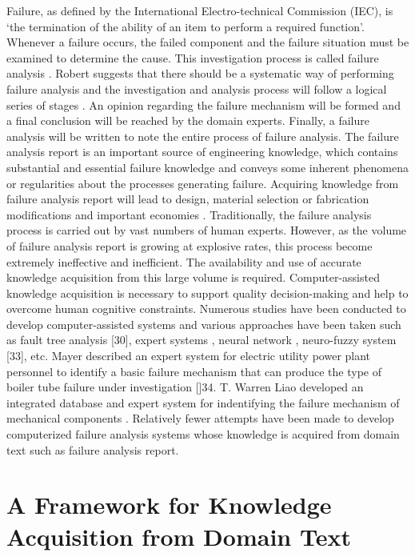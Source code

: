 \documentclass{elsarticle}
\begin{document}
Failure, as defined by the International Electro-technical Commission (IEC), is ‘the termination of the ability of an item to perform a required function’. Whenever a failure occurs, the failed component and the failure situation must be examined to determine the cause. This investigation process is called failure analysis \cite{Liao1999}. Robert suggests that there should be a systematic way of performing failure analysis and the investigation and analysis process will follow a logical series of stages \cite{roberts1980stm}. An opinion regarding the failure mechanism will be formed and a final conclusion will be reached by the domain experts. Finally, a failure analysis will be written to note the entire process of failure analysis. The failure analysis report is an important source of engineering knowledge, which contains substantial and essential failure knowledge and conveys some inherent phenomena or regularities about the processes generating failure. Acquiring knowledge from failure analysis report will lead to design, material selection or fabrication modifications and important economies \cite{Castro2004}. 
Traditionally, the failure analysis process is carried out by vast
numbers of human experts. However, as the volume of failure analysis
report is growing at explosive rates, this process become extremely
ineffective and inefficient. The availability and use of accurate
knowledge acquisition from this large volume is
required. Computer-assisted knowledge acquisition is necessary to
support quality decision-making and help to overcome human cognitive
constraints.  Numerous studies have been conducted to develop
computer-assisted systems and various approaches have been taken such
as fault tree analysis [30], expert systems \cite{Kim2004}, neural
network \cite{Zakarian1999}, neuro-fuzzy system [33], etc. Mayer described an expert system for electric utility power plant personnel to identify a basic failure mechanism that can produce the type of boiler tube failure under investigation []34. T. Warren Liao developed an integrated database and expert system for indentifying the failure mechanism of mechanical components \cite{liao1999ida}. Relatively fewer attempts have been made to develop computerized failure analysis systems whose knowledge is acquired from domain text such as failure analysis report.


\section{A Framework for Knowledge Acquisition from Domain Text
}
\label{sec:fram-knowl-acqu}
\end{document}
